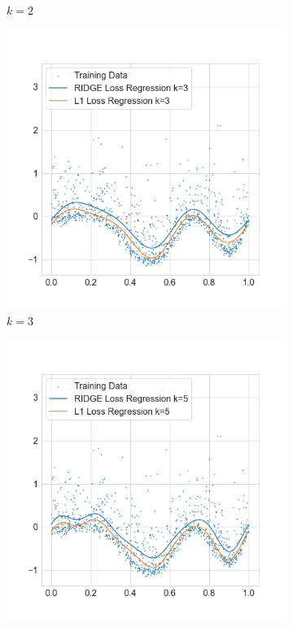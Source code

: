 \documentclass{./tufte-handout}
\begin{document}
\begin{enumerate}[(a)]
\begin{enumerate}
\begin{figure}[!ht]
\begin{subfigure}[b]{.5\textwidth}
          \caption{$k=2$}
        \end{subfigure}
        \begin{subfigure}[b]{.5\textwidth}
          \centering
          \includegraphics[width=1.2\linewidth]{../figures/l1_vs_ridge_regression_k_3.png}
          \caption{$k=3$}
        \end{subfigure}%
        \hfill
        \begin{subfigure}[b]{.5\textwidth}
          \centering
          \includegraphics[width=1.2\linewidth]{../figures/l1_vs_ridge_regression_k_5.png}

\end{subfigure}
\end{figure}
\end{enumerate}
\end{enumerate}
\end{document}
